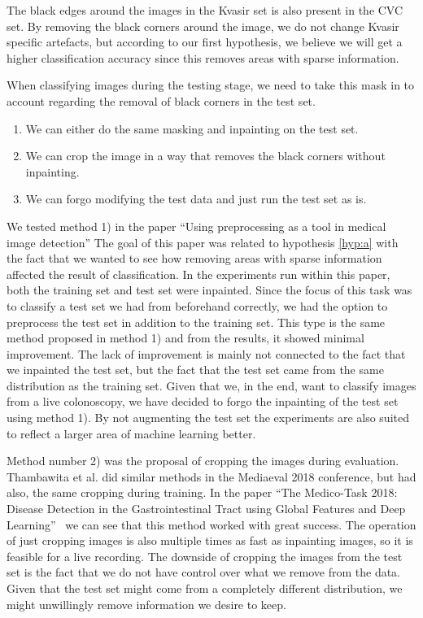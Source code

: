The black edges around the images in the Kvasir set is also present in the CVC set. By removing the black corners around the image, we do not change Kvasir specific artefacts, but according to our first hypothesis, we believe we will get a higher classification accuracy since this removes areas with sparse information.






When classifying images during the testing stage, we need to take this mask in to account regarding the removal of black corners in the test set.
\begin{enumerate}
\item We can either do the same masking and inpainting on the test set. 
\item We can crop the image in a way that removes the black corners without inpainting.
\item We can forgo modifying the test data and just run the test set as is. 
\end{enumerate}


We tested method 1) in the paper ``Using preprocessing as a tool in medical image detection''\cite{26254}
The goal of this paper was related to hypothesis \ref{hyp:a} with the fact that we wanted to see how removing areas with sparse information affected the result of classification. 
In the experiments run within this paper, both the training set and test set were inpainted. 
Since the focus of this task was to classify a test set we had from beforehand correctly, we had the option to preprocess the test set in addition to the training set. This type is the same method proposed in method 1) and from the results, it showed minimal improvement. The lack of improvement is mainly not connected to the fact that we inpainted the test set, but the fact that the test set came from the same distribution as the training set.
Given that we, in the end, want to classify images from a live colonoscopy, we have decided to forgo the inpainting of the test set using method 1).
By not augmenting the test set the experiments are also suited to reflect a larger area of machine learning better.




Method number 2) was the proposal of cropping the images during evaluation.  Thambawita et al. did similar methods in the Mediaeval 2018 conference, but had also, the same cropping during training. In the paper ``The Medico-Task 2018: Disease Detection in the Gastrointestinal Tract using Global Features and Deep Learning''~\cite{26205} we can see that this method worked with great success. 
The operation of just cropping images is also multiple times as fast as inpainting images, so it is feasible for a live recording.  
The downside of cropping the images from the test set is the fact that we do not have control over what we remove from the data. Given that the test set might come from a completely different distribution, we might unwillingly remove information we desire to keep.

